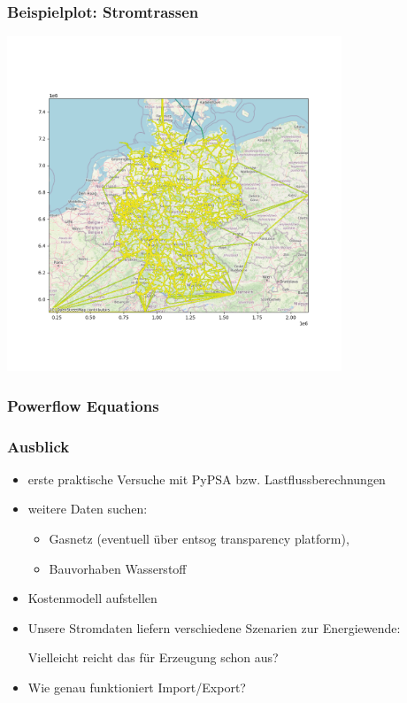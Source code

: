 \documentclass[aspectratio=169,t]{beamer}
\begin{document}
	\begin{frame}
		\frametitle{Beispielplot: Stromtrassen}
		\vspace*{-1.3cm}
		\hspace*{6cm}
		\includegraphics[height=10cm]{./line.png}
	\end{frame}

	\begin{frame}
		\frametitle{Powerflow Equations}
		
	\end{frame}
	
	

	
	
	\begin{frame}
		\frametitle{Ausblick}
		
		\vspace*{6mm}
		\begin{itemize}
			\item erste praktische Versuche mit PyPSA bzw. Lastflussberechnungen
			\item weitere Daten suchen:
			\begin{itemize}
				\item Gasnetz (eventuell über entsog transparency platform),
				\item Bauvorhaben Wasserstoff
			\end{itemize}
			\item Kostenmodell aufstellen
			\item Unsere Stromdaten liefern verschiedene Szenarien zur Energiewende:
			
			Vielleicht reicht das für Erzeugung schon aus? 
			\item Wie genau funktioniert Import/Export?
		\end{itemize}
			
		
	\end{frame}
	
	
	
	
	
	
	
\end{document}
